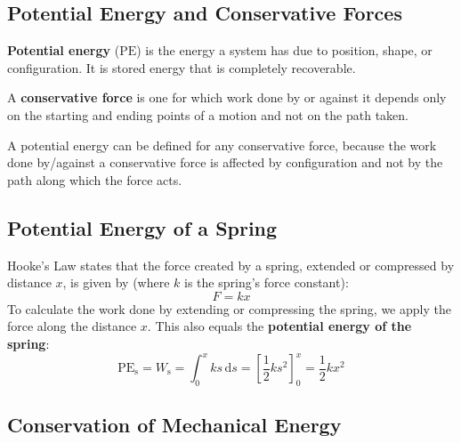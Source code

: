 \documentclass{article}
\newcommand{\definition}[1]{\begin{tcolorbox}[colback=red!5!white,colframe=red!75!black,parbox=false] #1 \end{tcolorbox}}
\begin{document}
\subsection{Potential Energy and Conservative Forces}

\definition{\textbf{Potential energy} ($\text{PE}$) is the energy a system has due to position, shape, or configuration. It is stored energy that is completely recoverable.}

\definition{A \textbf{conservative force} is one for which work done by or against it depends only on the starting and ending points of a motion and not on the path taken.}

A potential energy can be defined for any conservative force, because the work done by/against a conservative force is affected by configuration and not by the path along which the force acts.

\subsection{Potential Energy of a Spring}

Hooke's Law states that the force created by a spring, extended or compressed by distance $x$, is given by (where $k$ is the spring's force constant):
\begin{equation*}
    F=kx
\end{equation*}
To calculate the work done by extending or compressing the spring, we apply the force along the distance $x$. This also equals the \textbf{potential energy of the spring}:
\begin{equation*}
	\text{PE}_{\text{s}}
	=W_\text{s}
	=\int_{0}^{x}ks\,\mathrm{d}s
	=\left[\frac12 ks^2\right]_{0}^{x}
	=\frac12 kx^2
\end{equation*}

\subsection{Conservation of Mechanical Energy}
\end{document}
